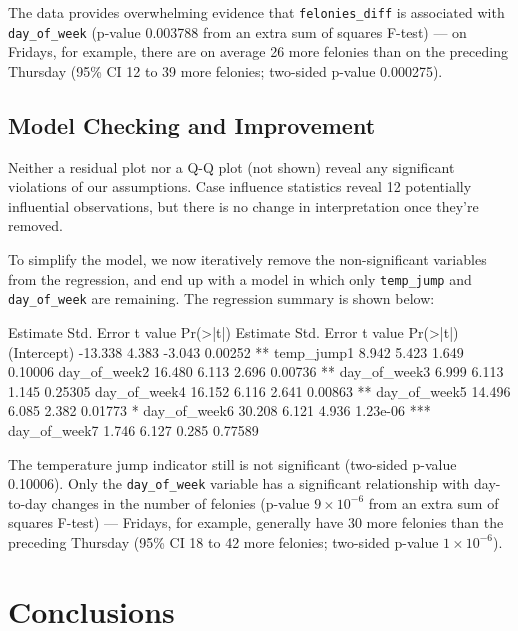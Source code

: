 \documentclass[11pt,notitlepage]{article}
\newenvironment{codeSmall}%
   {\par\noindent\adjustbox{margin=1ex,bgcolor=shadecolor,margin=0ex \medskipamount}\bgroup\minipage\linewidth\verbatim\footnotesize}%
   {\endverbatim\endminipage\egroup}
\begin{document}
The data provides overwhelming evidence that \texttt{felonies_diff} is associated with \texttt{day_of_week} (p-value 0.003788 from an extra sum of squares F-test) --- on Fridays, for example, there are on average 26 more felonies than on the preceding Thursday (95\% CI 12 to 39 more felonies; two-sided p-value 0.000275).


\subsection{Model Checking and Improvement}

Neither a residual plot nor a Q-Q plot (not shown) reveal any significant violations of our assumptions. Case influence statistics reveal 12 potentially influential observations, but there is no change in interpretation once they're removed.

To simplify the model, we now iteratively remove the non-significant variables from the regression, and end up with a model in which only \texttt{temp_jump} and \texttt{day_of_week} are remaining. The regression summary is shown below:

\begin{codeSmall}
             Estimate Std. Error t value Pr(>|t|)    
             Estimate Std. Error t value Pr(>|t|)    
(Intercept)   -13.338      4.383  -3.043  0.00252 ** 
temp_jump1      8.942      5.423   1.649  0.10006    
day_of_week2   16.480      6.113   2.696  0.00736 ** 
day_of_week3    6.999      6.113   1.145  0.25305    
day_of_week4   16.152      6.116   2.641  0.00863 ** 
day_of_week5   14.496      6.085   2.382  0.01773 *  
day_of_week6   30.208      6.121   4.936 1.23e-06 ***
day_of_week7    1.746      6.127   0.285  0.77589    
\end{codeSmall}


The temperature jump indicator still is not significant (two-sided p-value 0.10006). Only the \texttt{day_of_week} variable has a significant relationship with day-to-day changes in the number of felonies (p-value $9 \times 10^{-6}$ from an extra sum of squares F-test) --- Fridays, for example, generally have 30 more felonies than the preceding Thursday (95\% CI 18 to 42 more felonies; two-sided p-value $1 \times 10^{-6}$).


\section{Conclusions}
\label{sec:conclusion}
\end{document}
